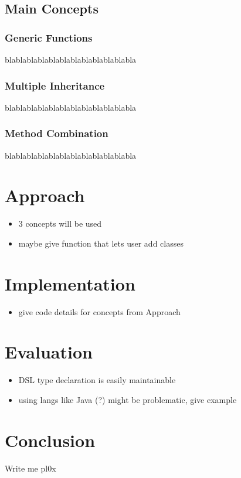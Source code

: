 \documentclass[oribibl]{llncs}
\begin{document}
\subsection{Main Concepts}
\label{sec:concepts}

\subsubsection{Generic Functions}
\label{sec:genfun}
blablablablablablablablablablablabla

\subsubsection{Multiple Inheritance}
\label{sec:mulinh}
blablablablablablablablablablablabla

\subsubsection{Method Combination}
\label{sec:metcom}
blablablablablablablablablablablabla



\section{Approach}
\label{sec:approach}


\begin{itemize}
\item 3 concepts will be used
\item maybe give function that lets user add classes
\end{itemize}


\section{Implementation}
\label{sec:implementation}

\begin{itemize}
\item give code details for concepts from Approach
\end{itemize}

\section{Evaluation}
\label{sec:evaluation}

\begin{itemize}
\item DSL type declaration is easily maintainable
\item using langs like Java (?) might be problematic, give example
\end{itemize}


\section{Conclusion}
\label{sec:conclusion}
Write me pl0x

\newpage
\nocite{*}


\end{document}
